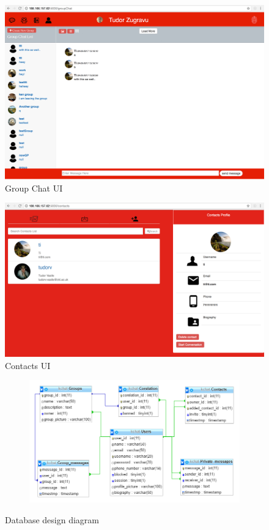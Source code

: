 \documentclass{article}
\begin{document}
\begin{figure}[H]
	\centering
	\includegraphics[scale=0.14]{groupChatUI.png}
	\caption{Group Chat UI}
\end{figure}

\begin{figure}[H]
	\centering
	\includegraphics[scale=0.25]{contactsUI.png}
	\caption{Contacts UI}
\end{figure}

\begin{figure}[H]
	\begin{subfigure}{\linewidth}
		\centering
		\includegraphics[width=.8\linewidth]{database-straight.png}\hfill
	\end{subfigure}\par\medskip
	\caption{Database design diagram}
\end{figure}
\end{document}
